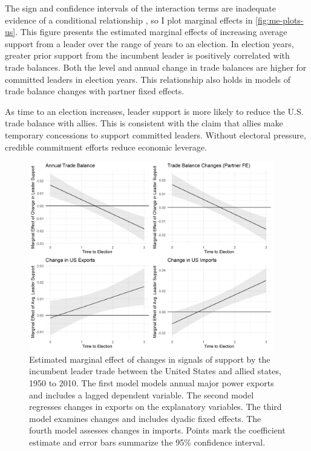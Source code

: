 \documentclass[12pt]{article}
\begin{document}
The sign and confidence intervals of the interaction terms are inadequate evidence of a conditional relationship \citep{BramborClarkGolder2006}, so I plot marginal effects in \autoref{fig:me-plots-us}.
This figure presents the estimated marginal effects of increasing average support from a leader over the range of years to an election.
In election years, greater prior support from the incumbent leader is positively correlated with trade balances. 
Both the level and annual change in trade balances are higher for committed leaders in election years.
This relationship also holds in models of trade balance changes with partner fixed effects.


As time to an election increases, leader support is more likely to reduce the U.S. trade balance with allies. 
This is consistent with the claim that allies make temporary concessions to support committed leaders.
Without electoral pressure, credible commitment efforts reduce economic leverage.


\begin{figure}[htpb]
	\centering
		\includegraphics[width=0.95\textwidth]{../figures/me-plots-us.png}
	\caption{Estimated marginal effect of changes in signals of support by the incumbent leader trade between the United States and allied states, 1950 to 2010. The first model models annual major power exports and includes a lagged dependent variable. The second model regresses changes in exports on the explanatory variables. The third model examines changes and includes dyadic fixed effects. The fourth model assesses changes in imports. Points mark the coefficient estimate and error bars summarize the 95\% confidence interval.}
	\label{fig:me-plots-us}
\end{figure}
\end{document}
